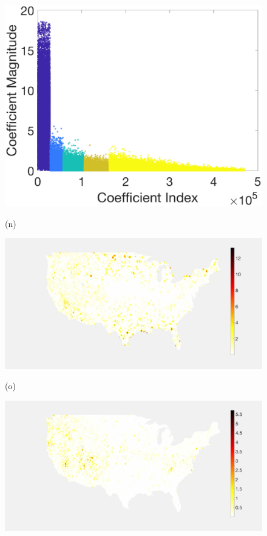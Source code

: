 \documentclass[journal, 10pt]{IEEEtran}
\begin{document}
\begin{figure}[tb]
\begin{minipage}[m]{0.24\linewidth}
\centerline{\includegraphics[width=1\linewidth]{fig_temp_analysis_coeffs_adapted}}
\centerline{\small{(n)}}
\end{minipage}
\begin{minipage}[m]{0.24\linewidth}
\centerline{\includegraphics[width=.95\linewidth]{fig_temp_error}}
\centerline{\small{(o)}}
\end{minipage}
\begin{minipage}[m]{0.24\linewidth}
\centerline{\includegraphics[width=.95\linewidth]{fig_temp_error_adapted}}

\end{minipage}
\end{figure}
\end{document}
